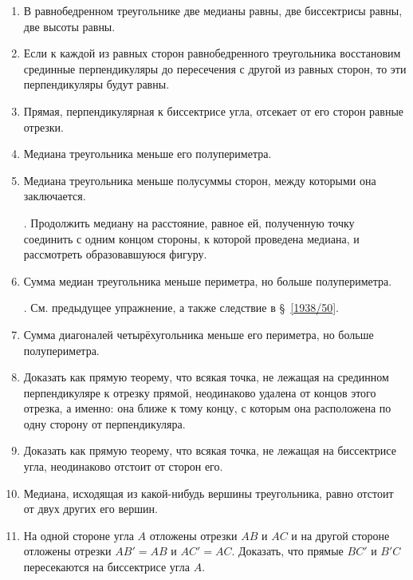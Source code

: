 \documentclass[oneside]{book}
\begin{document}
\begin{enumerate}

 \item
В равнобедренном треугольнике две медианы равны, две биссектрисы равны, две высоты равны.

 \item
Если к каждой из равных сторон равнобедренного треугольника восстановим срединные перпендикуляры до пересечения с другой из равных сторон, то эти перпендикуляры будут равны. 

 \item
Прямая, перпендикулярная к биссектрисе угла, отсекает от его сторон равные отрезки.

 \item
Медиана треугольника меньше его полупериметра.

 \item
Медиана треугольника меньше полусуммы сторон, между которыми она заключается.

.
Продолжить медиану на расстояние, равное ей, полученную точку соединить с одним концом стороны, к которой проведена медиана, и рассмотреть образовавшуюся фигуру.

 \item
Сумма медиан треугольника меньше периметра, но больше полупериметра.

.
См. предыдущее упражнение, а также следствие в §~\ref{1938/50}.

 \item
Сумма диагоналей четырёхугольника меньше его периметра, но больше полупериметра.

 \item
Доказать как прямую теорему, что всякая точка, не лежащая на срединном перпендикуляре к отрезку прямой, неодинаково удалена от концов этого отрезка, а именно: 
она ближе к тому концу, с которым она расположена по одну сторону от перпендикуляра.

 \item
Доказать как прямую теорему, что всякая точка, не лежащая на биссектрисе угла, неодинаково отстоит от сторон его.

 \item
Медиана, исходящая из какой-нибудь вершины треугольника, равно отстоит от двух других его вершин.

 \item
На одной стороне угла $A$ отложены отрезки $AB$ и $AC$ и на другой стороне отложены отрезки $AB'=AB$ и $AC' = AC$.
Доказать, что прямые $BC'$ и $B'C$ пересекаются на биссектрисе угла $A$.


\end{enumerate}
\end{document}
